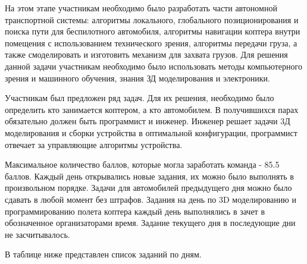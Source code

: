 На этом этапе участникам необходимо было разработать части автономной транспортной системы: алгоритмы локального, глобального позиционирования и поиска пути для беспилотного автомобиля, алгоритмы навигации коптера внутри помещения с использованием технического зрения, алгоритмы передачи груза, а также смоделировать и изготовить механизм для захвата грузов. Для решения данной задачи участникам необходимо было использовать методы компьютерного зрения и машинного обучения, знания ЗД моделирования и электроники. 

Участникам был предложен ряд задач. Для их решения, необходимо было определить кто занимается коптером, а кто автомобилем. В получившихся парах обязательно должен быть программист и инженер. Инженер решает задачи 3Д моделирования и сборки устройства в оптимальной конфигурации, программист отвечает за управляющие алгоритмы устройства.

Максимальное количество баллов, которые могла заработать команда - 85.5 баллов. Каждый день открывались новые задания, их можно было выполнять в произвольном порядке. Задачи для автомобилей предыдущего дня можно было сдавать в любой момент без штрафов. Задания на день по 3D моделированию и программированию полета коптера каждый день выполнялись в зачет в обозначенное организаторами время. Задание текущего дня в последующие дни не засчитывалось.

В таблице ниже представлен список заданий по дням.

